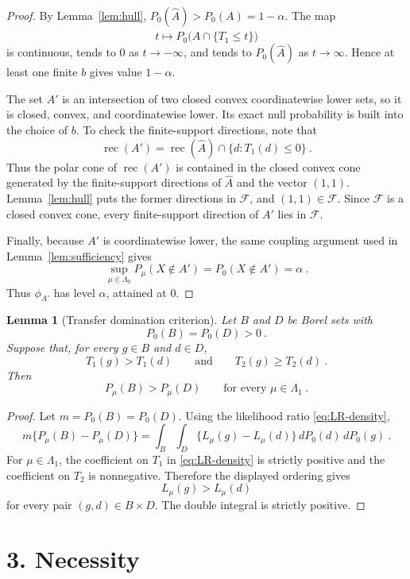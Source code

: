 \documentclass[12pt]{article}
\newtheorem{lemma}{Lemma}
\theoremstyle{remark}
\begin{document}
\begin{proof}
By Lemma~\ref{lem:hull}, $P_0(\widehat A)>P_0(A)=1-\alpha$.  The map
\[
t\mapsto P_0\big(\widehat A\cap\{T_1\le t\}\big)
\]
is continuous, tends to $0$ as $t\to-\infty$, and tends to $P_0(\widehat A)$ as $t\to\infty$.  Hence at least one finite $b$ gives value $1-\alpha$.

The set $A'$ is an intersection of two closed convex coordinatewise lower sets, so it is closed, convex, and coordinatewise lower.  Its exact null probability is built into the choice of $b$.  To check the finite-support directions, note that
\[
\operatorname{rec}(A')=\operatorname{rec}(\widehat A)\cap\{d:T_1(d)\le0\}~.
\]
Thus the polar cone of $\operatorname{rec}(A')$ is contained in the closed convex cone generated by the finite-support directions of $\widehat A$ and the vector $(1,1)$.  Lemma~\ref{lem:hull} puts the former directions in $\mathcal F$, and $(1,1)\in\mathcal F$.  Since $\mathcal F$ is a closed convex cone, every finite-support direction of $A'$ lies in $\mathcal F$.

Finally, because $A'$ is coordinatewise lower, the same coupling argument used in Lemma~\ref{lem:sufficiency} gives
\[
\sup_{\mu\in\Lambda_0}P_\mu(X\notin A')=P_0(X\notin A')=\alpha~.
\]
Thus $\phi_{A'}$ has level $\alpha$, attained at $0$.
\end{proof}

\begin{lemma}[Transfer domination criterion]\label{lem:transfer}
Let $B$ and $D$ be Borel sets with
\[
P_0(B)=P_0(D)>0~.
\]
Suppose that, for every $g\in B$ and $d\in D$,
\[
T_1(g)>T_1(d)
\qquad\text{and}\qquad
T_2(g)\ge T_2(d)~.
\]
Then
\[
P_\mu(B)>P_\mu(D)
\qquad\text{for every }\mu\in\Lambda_1~.
\]
\end{lemma}

\begin{proof}
Let $m=P_0(B)=P_0(D)$.  Using the likelihood ratio \eqref{eq:LR-density},
\[
m\{P_\mu(B)-P_\mu(D)\}
=
\int_B\int_D \{L_\mu(g)-L_\mu(d)\}\,dP_0(d)\,dP_0(g)~.
\]
For $\mu\in\Lambda_1$, the coefficient on $T_1$ in \eqref{eq:LR-density} is strictly positive and the coefficient on $T_2$ is nonnegative.  Therefore the displayed ordering gives
\[
L_\mu(g)>L_\mu(d)
\]
for every pair $(g,d)\in B\times D$.  The double integral is strictly positive.
\end{proof}

\section*{3. Necessity}
\end{document}
